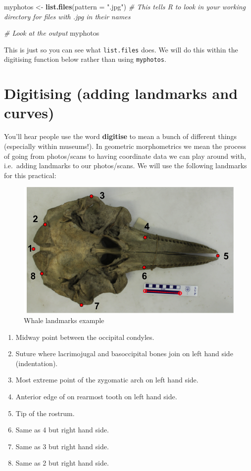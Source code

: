 \documentclass[]{book}
\newenvironment{Shaded}{\begin{snugshade}}{\end{snugshade}}
\newcommand{\KeywordTok}[1]{\textcolor[rgb]{0.13,0.29,0.53}{\textbf{{#1}}}}
\newcommand{\DataTypeTok}[1]{\textcolor[rgb]{0.13,0.29,0.53}{{#1}}}
\newcommand{\StringTok}[1]{\textcolor[rgb]{0.31,0.60,0.02}{{#1}}}
\newcommand{\CommentTok}[1]{\textcolor[rgb]{0.56,0.35,0.01}{\textit{{#1}}}}
\newcommand{\NormalTok}[1]{{#1}}
\providecommand{\tightlist}{%
  \setlength{\itemsep}{0pt}\setlength{\parskip}{0pt}}
\theoremstyle{definition}
\theoremstyle{definition}
\theoremstyle{definition}
\theoremstyle{remark}
\begin{document}
\begin{Shaded}
\begin{Highlighting}[]
\NormalTok{myphotos <-}\StringTok{ }\KeywordTok{list.files}\NormalTok{(}\DataTypeTok{pattern =} \StringTok{".jpg"}\NormalTok{)}
\CommentTok{# This tells R to look in your working directory for files with .jpg in their names}

\CommentTok{# Look at the output}
\NormalTok{myphotos}
\end{Highlighting}
\end{Shaded}

This is just so you can see what \texttt{list.files} does. We will do
this within the digitising function below rather than using
\texttt{myphotos}.

\section{Digitising (adding landmarks and
curves)}\label{digitising-adding-landmarks-and-curves}

You'll hear people use the word \textbf{digitise} to mean a bunch of
different things (especially within museums!). In geometric
morphometrics we mean the process of going from photos/scans to having
coordinate data we can play around with, i.e.~adding landmarks to our
photos/scans. We will use the following landmarks for this practical:

\begin{figure}
\centering
\includegraphics{whale.png}
\caption{Whale landmarks example}
\end{figure}

\begin{enumerate}
\def\labelenumi{\arabic{enumi}.}
\tightlist
\item
  Midway point between the occipital condyles.
\item
  Suture where lacrimojugal and basoccipital bones join on left hand
  side (indentation).
\item
  Most extreme point of the zygomatic arch on left hand side.
\item
  Anterior edge of on rearmost tooth on left hand side.
\item
  Tip of the rostrum.
\item
  Same as 4 but right hand side.
\item
  Same as 3 but right hand side.
\item
  Same as 2 but right hand side.
\end{enumerate}
\end{document}
